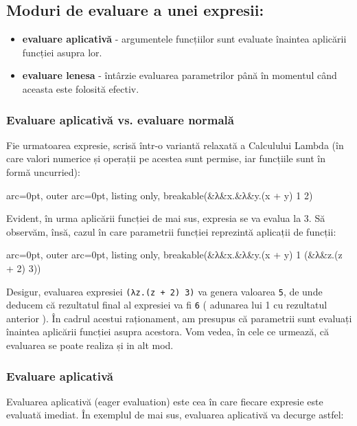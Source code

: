      
\subsection*{Moduri de evaluare a unei expresii: }
  \begin{itemize}
  	\item  \textbf{evaluare aplicativă} - argumentele funcțiilor sunt evaluate înaintea aplicării funcției asupra lor.
  	\item  \textbf{evaluare lenesa} - întârzie evaluarea parametrilor până în momentul când aceasta este folosită efectiv.
  \end{itemize}

\subsubsection*{Evaluare aplicativă vs. evaluare normală}

Fie urmatoarea expresie, scrisă într-o variantă relaxată a Calculului Lambda (în care valori numerice și operații pe acestea sunt permise, iar funcțiile sunt în formă uncurried):


\begin{tcblisting}{ arc=0pt, outer arc=0pt, listing only, breakable}(&λ&x.&λ&y.(x + y) 1 2)
\end{tcblisting}


Evident, în urma aplicării funcției de mai sus, expresia se va evalua la 3.
Să observăm, însă, cazul în care parametrii funcției reprezintă aplicații de funcții:
 

\begin{tcblisting}{ arc=0pt, outer arc=0pt, listing only, breakable}(&λ&x.&λ&y.(x + y) 1 (&λ&z.(z + 2) 3))
\end{tcblisting}


Desigur, evaluarea expresiei \texttt{(λz.(z + 2) 3)} va genera valoarea \texttt{5}, de unde deducem că rezultatul final al expresiei va fi \texttt{6} ( adunarea lui 1 cu rezultatul anterior ). În cadrul acestui raționament, am presupus că parametrii sunt evaluați înaintea aplicării funcției asupra acestora. Vom vedea, în cele ce urmează, că evaluarea se poate realiza și in alt mod.

\subsubsection*{Evaluare aplicativă}

Evaluarea aplicativă (eager evaluation) este cea în care fiecare expresie este evaluată imediat. În exemplul de mai sus, evaluarea aplicativă va decurge astfel:


